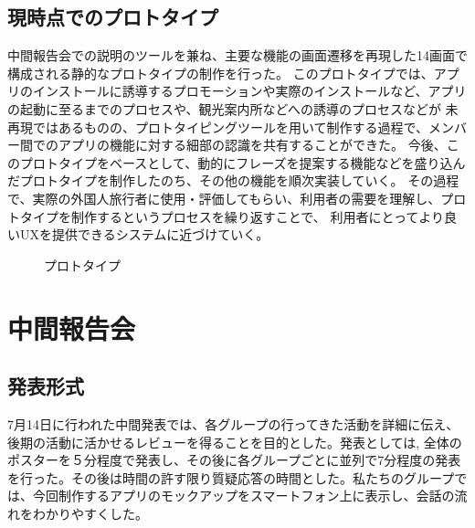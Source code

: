 \documentclass[openany,11pt,papersize]{jsbook}
\begin{document}
\section{現時点でのプロトタイプ}\label{sec:sannosan}
 中間報告会での説明のツールを兼ね、主要な機能の画面遷移を再現した14画面で構成される静的なプロトタイプの制作を行った。
このプロトタイプでは、アプリのインストールに誘導するプロモーションや実際のインストールなど、アプリの起動に至るまでのプロセスや、観光案内所などへの誘導のプロセスなどが
未再現ではあるものの、プロトタイピングツールを用いて制作する過程で、メンバー間でのアプリの機能に対する細部の認識を共有することができた。
今後、このプロトタイプをベースとして、動的にフレーズを提案する機能などを盛り込んだプロトタイプを制作したのち、その他の機能を順次実装していく。
その過程で、実際の外国人旅行者に使用・評価してもらい、利用者の需要を理解し、プロトタイプを制作するというプロセスを繰り返すことで、
利用者にとってより良いUXを提供できるシステムに近づけていく。
\begin{figure}[htbp]
 \begin{center}
 \end{center}
 \caption{プロトタイプ}
 \label{fig:prototype}
\end{figure}


\chapter{中間報告会}

\section{発表形式}
 7月14日に行われた中間発表では、各グループの行ってきた活動を詳細に伝え、後期の活動に活かせるレビューを得ることを目的とした。発表としては, 全体のポスターを５分程度で発表し、その後に各グループごとに並列で7分程度の発表を行った。その後は時間の許す限り質疑応答の時間とした。私たちのグループでは、今回制作するアプリのモックアップをスマートフォン上に表示し、会話の流れをわかりやすくした。
\end{document}
